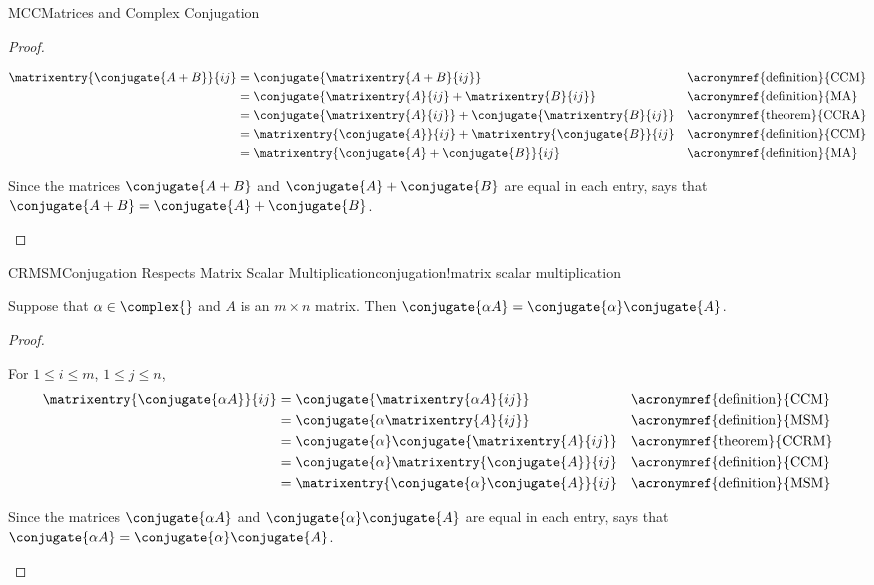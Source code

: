 \begin{subsect}{MCC}{Matrices and Complex Conjugation}
\begin{proof}
\begin{para}
%
\begin{align*}
%
\matrixentry{\conjugate{A+B}}{ij}
&=\conjugate{\matrixentry{A+B}{ij}}&&\text{\acronymref{definition}{CCM}}\\
&=\conjugate{\matrixentry{A}{ij}+\matrixentry{B}{ij}}&&\text{\acronymref{definition}{MA}}\\
&=\conjugate{\matrixentry{A}{ij}}+\conjugate{\matrixentry{B}{ij}}&&\text{\acronymref{theorem}{CCRA}}\\
&=\matrixentry{\conjugate{A}}{ij}+\matrixentry{\conjugate{B}}{ij}&&\text{\acronymref{definition}{CCM}}\\
&=\matrixentry{\conjugate{A}+\conjugate{B}}{ij}&&\text{\acronymref{definition}{MA}}
%
\end{align*}
\end{para}
%
\begin{para}Since the matrices  $\conjugate{A+B}$ and $\conjugate{A}+\conjugate{B}$  are equal in each entry,  says that $\conjugate{A+B}=\conjugate{A}+\conjugate{B}$.\end{para}
%
\end{proof}
%
\begin{theorem}{CRMSM}{Conjugation Respects Matrix Scalar Multiplication}{conjugation!matrix scalar multiplication}
\begin{para}Suppose that $\alpha\in\complex{\null}$ and $A$ is an $m\times n$ matrix.  Then $\conjugate{\alpha A}=\conjugate{\alpha}\conjugate{A}$.\end{para}
\end{theorem}
%
\begin{proof}
%
\begin{para}For $1\leq i\leq m$, $1\leq j\leq n$,
%
\begin{align*}
%
\matrixentry{\conjugate{\alpha A}}{ij}
&=\conjugate{\matrixentry{\alpha A}{ij}}&&\text{\acronymref{definition}{CCM}}\\
&=\conjugate{\alpha\matrixentry{A}{ij}}&&\text{\acronymref{definition}{MSM}}\\
&=\conjugate{\alpha}\conjugate{\matrixentry{A}{ij}}&&\text{\acronymref{theorem}{CCRM}}\\
&=\conjugate{\alpha}\matrixentry{\conjugate{A}}{ij}&&\text{\acronymref{definition}{CCM}}\\
&=\matrixentry{\conjugate{\alpha}\conjugate{A}}{ij}&&\text{\acronymref{definition}{MSM}}
%
\end{align*}
\end{para}
%
\begin{para}Since the matrices  $\conjugate{\alpha A}$ and $\conjugate{\alpha}\conjugate{A}$  are equal in each entry,  says that $\conjugate{\alpha A}=\conjugate{\alpha}\conjugate{A}$.\end{para}

\end{proof}
\end{subsect}
